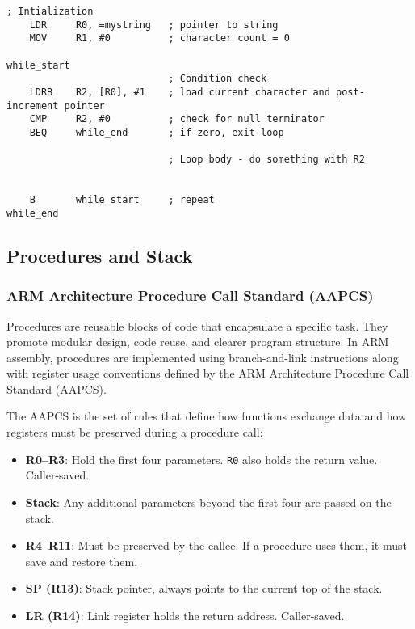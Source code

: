 \begin{lstlisting}[caption={While loop with string processing example}]
    ; Intialization
    LDR     R0, =mystring   ; pointer to string
    MOV     R1, #0          ; character count = 0

while_start
                            ; Condition check
    LDRB    R2, [R0], #1    ; load current character and post-increment pointer
    CMP     R2, #0          ; check for null terminator
    BEQ     while_end       ; if zero, exit loop
    
                            ; Loop body - do something with R2

    
    B       while_start     ; repeat
while_end
\end{lstlisting}


\subsection{Procedures and Stack}

\subsubsection{ARM Architecture Procedure Call Standard (AAPCS)}

Procedures are reusable blocks of code that encapsulate a specific task. They promote modular design, code reuse, and clearer program structure. In ARM assembly, procedures are implemented using branch-and-link instructions along with register usage conventions defined by the ARM Architecture Procedure Call Standard (AAPCS).

The AAPCS is the set of rules that define how functions exchange data and how registers must be preserved during a procedure call:

\begin{itemize}[nosep]
  \item \textbf{R0--R3}: Hold the first four parameters. \texttt{R0} also holds the return value. Caller-saved.
  \item \textbf{Stack}: Any additional parameters beyond the first four are passed on the stack.
  \item \textbf{R4--R11}: Must be preserved by the callee. If a procedure uses them, it must save and restore them. 
  \item \textbf{SP (R13)}: Stack pointer, always points to the current top of the stack.
  \item \textbf{LR (R14)}: Link register holds the return address. Caller-saved.
\end{itemize}
